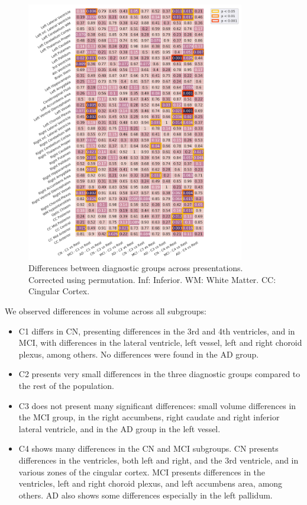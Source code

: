 \begin{figure}[!htbp]
\centering
\includegraphics[width=0.85\textwidth]{figures/cimlr/groupsdxcluster_againstrest.png}
\caption[Diagnostic interaction analysis.]{Differences between diagnostic groups across presentations. Corrected using permutation. Inf: Inferior. WM: White Matter. CC: Cingular Cortex.}
\label{dxcluster_againstrest}
\end{figure}

We observed differences in volume across all subgroups:

\begin{itemize}
    \item C1 differs in CN, presenting differences in the 3rd and 4th ventricles, and in MCI, with differences in the lateral ventricle, left vessel, left and right choroid plexus, among others. No differences were found in the AD group.
    \item C2 presents very small differences in the three diagnostic groups compared to the rest of the population.
    \item C3 does not present many significant differences: small volume differences in the MCI group, in the right accumbens, right caudate and right inferior lateral ventricle, and in the AD group in the left vessel. 
    \item C4 shows many differences in the CN and MCI subgroups. CN presents differences in the ventricles, both left and right, and the 3rd ventricle, and in various zones of the cingular cortex. MCI presents differences in the ventricles, left and right choroid plexus, and left accumbens area, among others. AD also shows some differences especially in the left pallidum.
\end{itemize}

